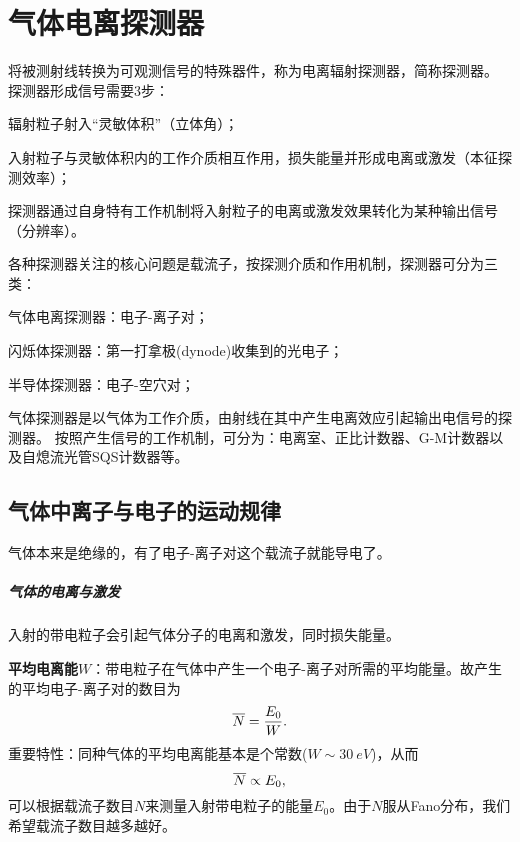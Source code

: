 \chapter{气体电离探测器}
将被测射线转换为可观测信号的特殊器件，称为电离辐射探测器，简称探测器。
探测器形成信号需要3步：
\begin{compactenum}
	\item 辐射粒子射入“灵敏体积”（立体角）；
	\item 入射粒子与灵敏体积内的工作介质相互作用，损失能量并形成电离或激发（本征探测效率）；
	\item 探测器通过自身特有工作机制将入射粒子的电离或激发效果转化为某种输出信号（分辨率）。
\end{compactenum}

各种探测器关注的核心问题是载流子，按探测介质和作用机制，探测器可分为三类：
\begin{compactitem}
	\item 气体电离探测器：电子-离子对；
	\item 闪烁体探测器：第一打拿极(dynode)收集到的光电子；
	\item 半导体探测器：电子-空穴对；
\end{compactitem}
气体探测器是以气体为工作介质，由射线在其中产生电离效应引起输出电信号的探测器。
按照产生信号的工作机制，可分为：电离室、正比计数器、G-M计数器以及自熄流光管SQS计数器等。

\section{气体中离子与电子的运动规律}

气体本来是绝缘的，有了电子-离子对这个载流子就能导电了。
\paragraph{气体的电离与激发}
入射的带电粒子会引起气体分子的电离和激发，同时损失能量。%

\textbf{平均电离能}$W$：带电粒子在气体中产生一个电子-离子对所需的平均能量。故产生的平均电子-离子对的数目为
\begin{align}
	\overline{N}=\frac{E_0}W.
\end{align}
重要特性：同种气体的平均电离能基本是个常数($W\sim\SI{30}{eV}$)，从而
\[
	\overline{N}\propto E_0,
\]
可以根据载流子数目$N$来测量入射带电粒子的能量$E_0$。由于$N$服从Fano分布，我们希望载流子数目越多越好。



